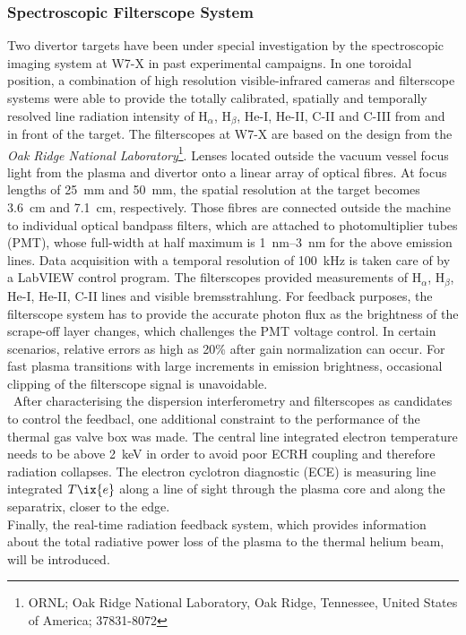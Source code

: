        \subsubsection*{Spectroscopic Filterscope System}%
%
            Two divertor targets have been under special investigation by the spectroscopic imaging system at W7-X in past experimental campaigns\cite{Stephey2016}. In one toroidal position, a combination of high resolution visible-infrared cameras and filterscope systems were able to provide the totally calibrated, spatially and temporally resolved line radiation intensity of H$_{\alpha}$, H$_{\beta}$, He-I, He-II, C-II and C-III from and in front of the target. The filterscopes at W7-X are based on the design from the \textit{Oak Ridge National Laboratory}\footnote[1]{ORNL; Oak Ridge National Laboratory, Oak Ridge, Tennessee, United States of America; 37831-8072}. Lenses located outside the vacuum vessel focus light from the plasma and divertor onto a linear array of optical fibres. At focus lengths of \SI{25}{mm} and \SI{50}{\milli\meter}, the spatial resolution at the target becomes \SI{3.6}{\centi\meter} and \SI{7.1}{\centi\meter}, respectively. Those fibres are connected outside the machine to individual optical bandpass filters, which are attached to photomultiplier tubes (PMT), whose full-width at half maximum is \SIrange{1}{3}{\nano\meter} for the above emission lines. Data acquisition with a temporal resolution of \SI{100}{\kilo\hertz} is taken care of by a LabVIEW\textsuperscript{\textregistered} control program. The filterscopes provided measurements of H$_{\alpha}$, H$_{\beta}$, He-I, He-II, C-II lines and visible bremsstrahlung\cite{Stephey2016}. For feedback purposes, the filterscope system has to provide the accurate photon flux as the brightness of the scrape-off layer changes, which challenges the PMT voltage control. In certain scenarios, relative errors as high as 20\% after gain normalization can occur. For fast plasma transitions with large increments in emission brightness, occasional clipping of the filterscope signal is unavoidable\cite{Colchin2003,Brooks2008}.\\
%
        \,\newline%
        After characterising the dispersion interferometry and filterscopes as candidates to control the feedbacl, one additional constraint to the performance of the thermal gas valve box was made. The central line integrated electron temperature needs to be above \SI{2}{\kilo\electronvolt} in order to avoid poor ECRH coupling and therefore radiation collapses. The electron cyclotron diagnostic (ECE) is measuring line integrated $T\ix{e}$ along a line of sight through the plasma core and along the separatrix, closer to the edge\cite{Krychowiak2021,Hirsch2019,Marushchenko2006}.\\%
        Finally, the real-time radiation feedback system, which provides information about the total radiative power loss of the plasma to the thermal helium beam, will be introduced.%
%
